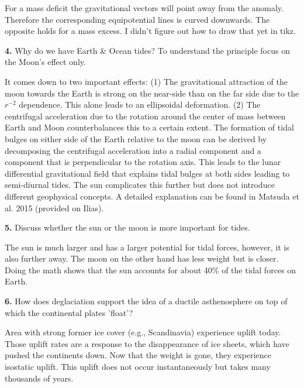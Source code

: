 \ifanswers
  \begin{tcolorbox}[enhanced jigsaw,breakable,pad at break*=1mm,
    colback=blue!5!white,colframe=babyblueeyes,title=Solutions]
  For a mass deficit the gravitational vectors will point away from the anomaly. Therefore the corresponding equipotential lines is curved downwards. The opposite holds for a mass excess. I didn't figure out how to draw that yet in tikz.
  \end{tcolorbox}
  \fi
  \textbf{4.} Why do we have Earth \& Ocean tides? To understand the principle focus on the Moon's effect only.\\

  \ifanswers
    \begin{tcolorbox}[enhanced jigsaw,breakable,pad at break*=1mm,
      colback=blue!5!white,colframe=babyblueeyes,title=Solutions]
    It comes down to two important effects: (1) The gravitational attraction of the moon towards the Earth is strong on the near-side than on the far side due to the $r^{-2}$ dependence. This alone leads to an ellipsoidal deformation. (2) The centrifugal acceleration due to the rotation around the center of mass between Earth and Moon counterbalances this to a certain extent. The formation of tidal bulges on either side of the Earth relative to the moon can be derived by decomposing the centrifugal acceleration into a radial component and a component that is perpendicular to the rotation axis. This leads to the lunar differential gravitational field that explains tidal bulges at both sides leading to semi-diurnal tides. The sun complicates this further but does not introduce different geophysical concepts. A detailed explanation can be found in Matsuda et al. 2015 (provided on Ilias).
    \end{tcolorbox}
    \fi
    \textbf{5.} Discuss whether the sun or the moon is more important for tides.\\

  
    \ifanswers
      \begin{tcolorbox}[enhanced jigsaw,breakable,pad at break*=1mm,
        colback=blue!5!white,colframe=babyblueeyes,title=Solutions]
        The sun is much larger and has a larger potential for tidal forces, however, it is also further away. The moon on the other hand has less weight but is closer. Doing the math shows that the sun accounts for about 40\% of the tidal forces on Earth.
      \end{tcolorbox}
    \fi
      \textbf{6.} How does deglaciation support the idea of a ductile asthenosphere on top of which the continental plates 'float'? 

      \ifanswers
      \begin{tcolorbox}[enhanced jigsaw,breakable,pad at break*=1mm,
        colback=blue!5!white,colframe=babyblueeyes,title=Solutions]
        Area with strong former ice cover (e.g., Scandinavia) experience uplift today. Those uplift rates are a response to the disappearance of ice sheets, which have pushed the continents down. Now that the weight is gone, they experience isostatic uplift. This uplift does not occur instantaneously but takes many thousands of years. 
      \end{tcolorbox} 
    \fi